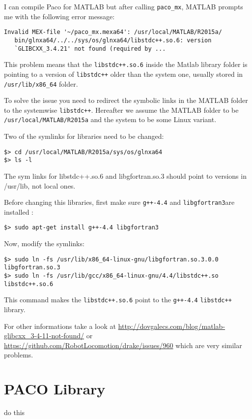 \documentclass[11pt,%
              a4paper,%
]{article}
\begin{document}
I can compile Paco for MATLAB but after calling \texttt{paco\_mx},
MATLAB prompts me with the following error message:

\begin{verbatim}
Invalid MEX-file '~/paco_mx.mexa64': /usr/local/MATLAB/R2015a/
   bin/glnxa64/../../sys/os/glnxa64/libstdc++.so.6: version
   `GLIBCXX_3.4.21' not found (required by ...
\end{verbatim}

This problem means that the \texttt{libstdc++.so.6} inside the Matlab
library folder is pointing to a version of \texttt{libstdc++} older than
the system one, usually stored in \texttt{/usr/lib/x86\_64} folder.

To solve the issue you need to redirect the symbolic links in the MATLAB
folder to the systemwise \texttt{libstdc++}. Hereafter we assume the
MATLAB folder to be \texttt{/usr/local/MATLAB/R2015a} and the system to
be some Linux variant.

Two of the symlinks for libraries need to be changed:

\begin{verbatim}
$> cd /usr/local/MATLAB/R2015a/sys/os/glnxa64
$> ls -l
\end{verbatim}
The sym links for libstdc++.so.6 and libgfortran.so.3 should point to
versions in /usr/lib, not local ones.

Before changing this libraries, first make sure \texttt{g++-4.4} and
\texttt{libgfortran3}are installed :

\begin{verbatim}
$> sudo apt-get install g++-4.4 libgfortran3
\end{verbatim}
Now, modify the symlinks:

\begin{verbatim}
$> sudo ln -fs /usr/lib/x86_64-linux-gnu/libgfortran.so.3.0.0 libgfortran.so.3
$> sudo ln -fs /usr/lib/gcc/x86_64-linux-gnu/4.4/libstdc++.so libstdc++.so.6
\end{verbatim}

This command makes the \texttt{libstdc++.so.6} point to the
\texttt{g++-4.4} \texttt{libstdc++} library.

For other informations take a look at
\url{http://dovgalecs.com/blog/matlab-glibcxx\_3-4-11-not-found/} or 
\url{https://github.com/RobotLocomotion/drake/issues/960} which are very
similar problems.

\section{PACO Library}
do this
\end{document}
